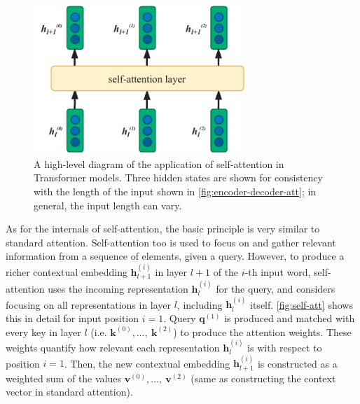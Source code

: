 \documentclass[bsc,frontabs,singlespacing,parskip,deptreport]{infthesis}
\begin{document}
{{{      \begin{figure}[h!t]
        \centering
        \includegraphics[width=8cm]{graphics/self-att-layer}
        \cprotect\caption{A high-level diagram of the application of self-attention in Transformer models. Three hidden states are shown for consistency with the length of the input shown in \autoref{fig:encoder-decoder-att}; in general, the input length can vary.}
        \label{fig:self-att-layer}
      \end{figure}

      As for the internals of self-attention, the basic principle is very similar to standard attention. Self-attention too is used to focus on and gather relevant information from a sequence of elements, given a query. However, to produce a richer contextual embedding $\bm{h}_{l+1}^{(i)}$ in layer $l+1$ of the $i$-th input word, self-attention uses the incoming representation $\bm{h}_l^{(i)}$ for the query, and considers focusing on all representations in layer $l$, including $\bm{h}_l^{(i)}$ itself. \autoref{fig:self-att} shows this in detail for input position $i=1$. Query $\bm{q}^{(1)}$ is produced and matched with every key in layer $l$ (i.e. $\bm{k}^{(0)},\ldots,\ \bm{k}^{(2)}$) to produce the attention weights. These weights quantify how relevant each representation $\bm{h}_l^{(i)}$ is with respect to position $i=1$. Then, the new contextual embedding $\bm{h}_{l+1}^{(i)}$ is constructed as a weighted sum of the values $\bm{v}^{(0)},\ldots,\ \bm{v}^{(2)}$ (same as constructing the context vector in standard attention).

}}}
\end{document}
